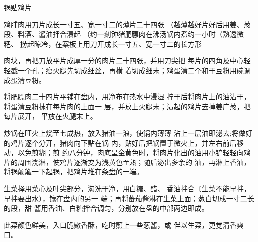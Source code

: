 \begin{recipe}{锅贴鸡片}

\ingredients


\cooking

\step 鸡脯肉用刀片成长一寸五、宽一寸二的薄片二十四张 （越薄越好片好后用姜、葱段、料酒、酱油拌合渍起 （约一刻钟猪肥膘肉在沸汤锅内煮约一小时（熟透微粑、 捞起晾冷，在案板上用刀开成长一寸五、宽一寸二的长方形

肉块，再把刀放平片成厚一分的肉片二十四张，并用刀尖把 每片的四角及中心轻轻戳一个孔；瘦火腿先切成细丝，再横 着切成细末；鸡蛋清二个和干豆粉用碗调成蛋清豆粉。

\step 将肥膘肉二十四片平铺在盘内，用净布在热水中浸湿 拧干后将肉片上的油沾干，将蛋清豆粉抹在每片肉的上面一 层，并放上火腿末；渍起的鸡片去掉姜广葱，把每片展开， 平放在火腿末上。

\step 炒锅在旺火上烧至七成热，放入猪油一浪，使锅内薄薄 沾上一层油即泌去;将做好的鸡片逐个分开，猪肉向下贴在锅 内，贴好后把锅置于微火上，并左右前后移动，以免煎糊；煎 约八分钟，肉底呈金黄色时，将肉片化出的油用小铲轻轻向鸡 片的周围浇淋，使鸡片逐渐变为浅黄色至熟；随后泌出多余的 油，再淋上香油，将锅颠簸一下起锅，把鸡片堆在条盘的一端。

\step 生菜择用菜心及叶尖部分，淘洗干净，用白糖、醋、 香油拌合〔生菜不能早拌，早拌要出水），镶在盘内的另一 端；再将蕃茄酱淋在生菜上面；葱白切成一寸二长的段，甜 酱用香油、白糖拌合调匀，分别放在盘的中部两边即成。

\notes

此菜颜色鲜美，入口脆嫩香酥，吃时蘸上一些葱酱，或 伴以生菜，更觉清香爽口。

\end{recipe}

